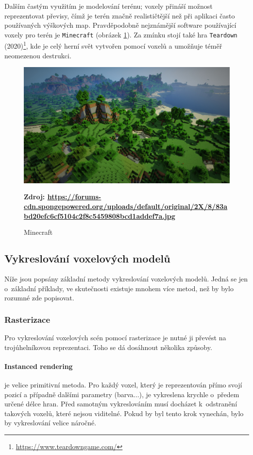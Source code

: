 Dalším častým využitím je modelování terénu; voxely přináší možnost reprezentovat převisy, čímž je terén značně realističtější než při aplikaci často používaných výškových map. Pravděpodobně nejznámější software používající voxely pro terén je \texttt{Minecraft} (obrázek \ref{fig:minecraft}). Za zmínku stojí také hra \texttt{Teardown} (2020)\footnote{\url{https://www.teardowngame.com/}}, kde je celý herní svět vytvořen pomocí voxelů a umožňuje téměř neomezenou destrukci.

\begin{figure}[H]
	\centering
	\includegraphics[scale=0.13]{obrazky-figures/minecraft.jpg}
	\caption{Minecraft}
	\textbf{Zdroj: \url{https://forums-cdn.spongepowered.org/uploads/default/original/2X/8/83abd20efc6cf5104c2f8c5459808bcd1addef7a.jpg}}
	\label{fig:minecraft}
\end{figure}

\subsection{Vykreslování voxelových modelů}
Níže jsou popsány základní metody vykreslování voxelových modelů. Jedná se jen o~základní příklady, ve skutečnosti existuje mnohem více metod, než by bylo rozumné zde popisovat.

\subsubsection{Rasterizace}
Pro vykreslování voxelových scén pomocí rasterizace je nutné ji převést na trojúhelníkovou reprezentaci. Toho se dá dosáhnout několika způsoby.

\paragraph{Instanced rendering} je velice primitivní metoda. Pro každý voxel, který je reprezentován přímo svojí pozicí a případně dalšími parametry (barva...), je vykreslena krychle o~předem určené délce hran. Před samotným vykreslováním musí docházet k~odstranění takových voxelů, které nejsou viditelné. Pokud by byl tento krok vynechán, bylo by vykreslování velice náročné. \cite{nousiainen_2019}

